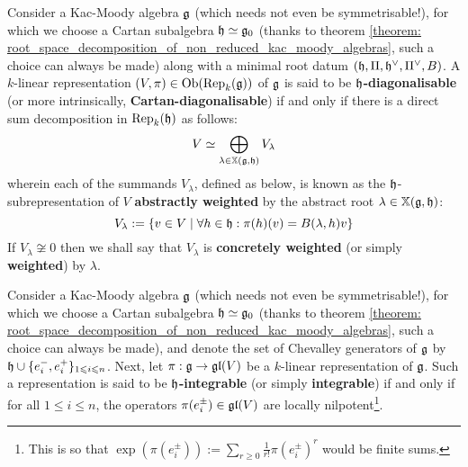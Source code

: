            \begin{definition} \label{def: cartan_diagonalisability}
                Consider a Kac-Moody algebra $\mathfrak{g}$ (which needs not even be symmetrisable!), for which we choose a Cartan subalgebra $\mathfrak{h} \simeq \mathfrak{g}_0$ (thanks to theorem \ref{theorem: root_space_decomposition_of_non_reduced_kac_moody_algebras}, such a choice can always be made) along with a minimal root datum $(\mathfrak{h}, \Pi, \mathfrak{h}^{\vee}, \Pi^{\vee}, B)$. A $k$-linear representation $(V, \pi) \in \mathrm{Ob}(\mathrm{Rep}_k(\mathfrak{g}))$ of $\mathfrak{g}$ is said to be \textbf{$\mathfrak{h}$-diagonalisable} (or more intrinsically, \textbf{Cartan-diagonalisable}) if and only if there is a direct sum decomposition in $\mathrm{Rep}_k(\mathfrak{h})$ as follows:
                    $$V \simeq \bigoplus_{\lambda \in \mathbb{X}(\mathfrak{g}, \mathfrak{h})} V_{\lambda}$$
                wherein each of the summands $V_{\lambda}$, defined as below, is known as the $\mathfrak{h}$-subrepresentation of $V$ \textbf{abstractly weighted} by the abstract root $\lambda \in \mathbb{X}(\mathfrak{g}, \mathfrak{h})$:
                    $$V_{\lambda} := \{v \in V \mid \forall h \in \mathfrak{h}: \pi(h)(v) = B(\lambda, h) v\}$$
                If $V_{\lambda} \not \cong 0$ then we shall say that $V_{\lambda}$ is \textbf{concretely weighted} (or simply \textbf{weighted}) by $\lambda$.
            \end{definition}
            \begin{definition} \label{def: integrable_representations_of_kac_moody_algebras}
                Consider a Kac-Moody algebra $\mathfrak{g}$ (which needs not even be symmetrisable!), for which we choose a Cartan subalgebra $\mathfrak{h} \simeq \mathfrak{g}_0$ (thanks to theorem \ref{theorem: root_space_decomposition_of_non_reduced_kac_moody_algebras}, such a choice can always be made), and denote the set of Chevalley generators of $\mathfrak{g}$ by $\mathfrak{h} \cup \{e_i^-, e_i^+\}_{1 \leqslant i \leqslant n}$. Next, let $\pi: \mathfrak{g} \to \mathfrak{gl}(V)$ be a $k$-linear representation of $\mathfrak{g}$. Such a representation is said to be \textbf{$\mathfrak{h}$-integrable} (or simply \textbf{integrable}) if and only if for all $1 \leq i \leq n$, the operators $\pi(e_i^{\pm}) \in \mathfrak{gl}(V)$ are locally nilpotent\footnote{This is so that $\exp(\pi(e_i^{\pm})) := \sum_{r \geq 0} \frac{1}{r!} \pi(e_i^{\pm})^r$ would be finite sums.}.
            \end{definition}
        
